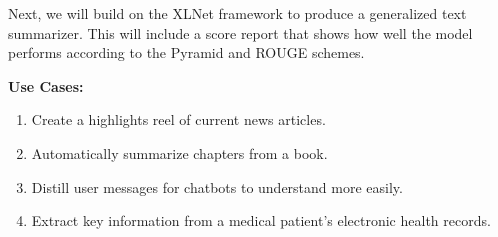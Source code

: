 Next, we will build on the XLNet framework to produce a generalized text summarizer.
This will include a score report that shows how well the model performs according to the Pyramid and ROUGE schemes.

\vspace{1pt}

\noindent\textbf{Use Cases:}

\vspace{0pt}

\begin{enumerate}[label=\textbf{\arabic*}, labelsep=0.1em, itemsep=0em, topsep=0em, font=\small]
    \item Create a highlights reel of current news articles.
    \item Automatically summarize chapters from a book.
    \item Distill user messages for chatbots to understand more easily.
    \item Extract key information from a medical patient’s electronic health records.
\end{enumerate}